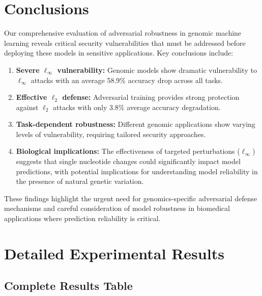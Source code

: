 \documentclass{article} %
\begin{document}
\section{Conclusions}

Our comprehensive evaluation of adversarial robustness in genomic machine learning reveals critical security vulnerabilities that must be addressed before deploying these models in sensitive applications. Key conclusions include:

\begin{enumerate}
    \item \textbf{Severe $\ell_\infty$ vulnerability:} Genomic models show dramatic vulnerability to $\ell_\infty$ attacks with an average 58.9\% accuracy drop across all tasks.
    
    \item \textbf{Effective $\ell_2$ defense:} Adversarial training provides strong protection against $\ell_2$ attacks with only 3.8\% average accuracy degradation.
    
    \item \textbf{Task-dependent robustness:} Different genomic applications show varying levels of vulnerability, requiring tailored security approaches.
    
    \item \textbf{Biological implications:} The effectiveness of targeted perturbations ($\ell_\infty$) suggests that single nucleotide changes could significantly impact model predictions, with potential implications for understanding model reliability in the presence of natural genetic variation.
\end{enumerate}

These findings highlight the urgent need for genomics-specific adversarial defense mechanisms and careful consideration of model robustness in biomedical applications where prediction reliability is critical.




\appendix

\section{Detailed Experimental Results}

\subsection{Complete Results Table}
\end{document}
